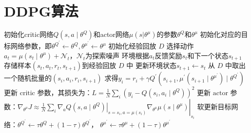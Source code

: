 \documentclass[11pt]{ctexart}
\begin{document}
\section{DDPG算法}
\begin{algorithm}[H] %
	\renewcommand{\thealgorithm}{} %
	\caption{} 
	\begin{algorithmic}[1] %
		\STATE 初始化critic网络$Q\left(s, a \mid \theta^Q\right)$和actor网络$\mu(s|\theta^{\mu})$的参数$\theta^Q$和$\theta^{\mu}$
		\STATE 初始化对应的目标网络参数，即$\theta^{Q^{\prime}} \leftarrow \theta^Q, \theta^{\mu^{\prime}} \leftarrow \theta^\mu$
		\STATE 初始化经验回放 $D$
			\STATE 选择动作$a_t=\mu\left(s_t \mid \theta^\mu\right)+\mathcal{N}_t$，$\mathcal{N}_t$为探索噪声
			\STATE 环境根据$a_t$反馈奖励$s_t$和下一个状态$s_{t+1}$
			\STATE 存储样本$(s_t,a_t,r_t,s_{t+1})$到经验回放 $D$ 中
			\STATE 更新环境状态$s_{t+1} \leftarrow s_t$
			\STATE 从 $D$ 中取出一个随机批量的$(s_i,a_i,r_i,s_{i+1})$
			\STATE 求得$y_i=r_i+\gamma Q^{\prime}\left(s_{i+1}, \mu^{\prime}\left(s_{i+1} \mid \theta^{\mu^{\prime}}\right) \mid \theta^{Q^{\prime}}\right)$
			\STATE 更新 $\text{critic}$ 参数，其损失为：$L=\frac{1}{N} \sum_i\left(y_i-Q\left(s_i, a_i \mid \theta^Q\right)\right)^2$
			\STATE 更新 $\text{actor}$ 参数：$\left.\left.\nabla_{\theta^\mu} J \approx \frac{1}{N} \sum_i \nabla_a Q\left(s, a \mid \theta^Q\right)\right|_{s=s_i, a=\mu\left(s_i\right)} \nabla_{\theta^\mu} \mu\left(s \mid \theta^\mu\right)\right|_{s_i}$
			\STATE 软更新目标网络：$\theta^{Q^{\prime}} \leftarrow \tau \theta^Q+(1-\tau) \theta^{Q^{\prime}}$，
			$\theta^{\mu^{\prime}} \leftarrow \tau \theta^\mu+(1-\tau) \theta^{\mu^{\prime}}$
		\ENDFOR
	\end{algorithmic}
\end{algorithm}
\clearpage
\end{document}
